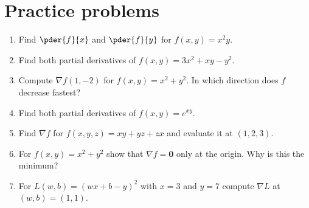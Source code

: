\section*{Practice problems}
\begin{enumerate}[label=\textbf{\thechapter.\arabic*}]
  \item Find $\pder{f}{x}$ and $\pder{f}{y}$ for $f(x,y)=x^2y$.
  \item Find both partial derivatives of $f(x,y)=3x^2+xy-y^2$.
  \item Compute $\nabla f(1,-2)$ for $f(x,y)=x^2+y^2$. In which direction does $f$ decrease fastest?
  \item Find both partial derivatives of $f(x,y)=e^{xy}$.
  \item Find $\nabla f$ for $f(x,y,z)=xy+yz+zx$ and evaluate it at $(1,2,3)$.
  \item For $f(x,y)=x^2+y^2$ show that $\nabla f=\mathbf 0$ only at the origin. Why is this the minimum?
  \item[\textbf{7.7}$\star$] For $L(w,b)=(wx+b-y)^2$ with $x=3$ and $y=7$ compute $\nabla L$ at $(w,b)=(1,1)$.
\end{enumerate}

